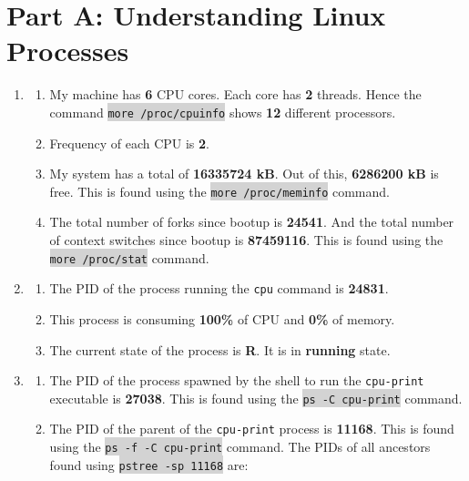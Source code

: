\documentclass[a4paper]{article}
\newcommand{\command}[1]{\colorbox{lightgray}{\texttt{#1}}}
\begin{document}



\section*{Part A: Understanding Linux Processes}

\begin{enumerate}
	\item 
	\begin{enumerate}
		\item My machine has \textbf{6} CPU cores. Each core has \textbf{2} threads. Hence the command \command{more /proc/cpuinfo} shows \textbf{12} different processors.
		\item Frequency of each CPU is \textbf{2}.
		\item My system has a total of \textbf{16335724 kB}. Out of this, \textbf{6286200 kB} is free. This is found using the \command{more /proc/meminfo} command.
		\item The total number of forks since bootup is \textbf{24541}. And the total number of context switches since bootup is \textbf{87459116}. This is found using the \command{more /proc/stat} command.
	\end{enumerate}
	\item 
	\begin{enumerate}
		\item The PID of the process running the \texttt{cpu} command is \textbf{24831}.
		\item This process is consuming \textbf{100\%} of CPU and \textbf{0\%} of memory.
		\item The current state of the process is \textbf{R}. It is in \textbf{running} state.
	\end{enumerate}
	\item 
	\begin{enumerate}
		\item The PID of the process spawned by the shell to run the \texttt{cpu-print} executable is \textbf{27038}. This is found using the \command{ps -C cpu-print} command.
		\item The PID of the parent of the \texttt{cpu-print} process is \textbf{11168}. This is found using the \command{ps -f -C cpu-print} command. The PIDs of all ancestors found using \command{pstree -sp 11168} are:

\end{enumerate}
\end{enumerate}
\end{document}
